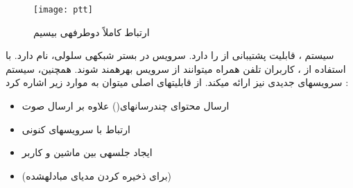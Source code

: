 \begin{figure}[H]
\centering
\texttt{[image: ptt]}
\caption{ارتباط کاملاً دوطرفه\nf ی بی\nf سیم}
\label{ptt}
\end{figure}  

سیستم ، قابلیت پشتیبانی از  را دارد. سرویس  در بستر شبکه\nf ی سلولی،  نام دارد. با استفاده از ، کاربران تلفن همراه می\nf توانند از سرویس  بهره\nf مند شوند. همچنین، سیستم  سرویس\nf های جدیدی نیز ارائه می\nf کند. از قابلیت\nf های اصلی  می\nf توان به موارد زیر اشاره کرد \cite{weboma}:

\begin{itemize}
\item ارسال محتوای چندرسانه\nf ای() علاوه بر ارسال صوت
\item ارتباط با سرویس\nf های کنونی 
\item ایجاد جلسه\nf ی  بین ماشین و کاربر
\item {}(برای ذخیره کردن مدیای مبادله\nf شده)
\end{itemize}


